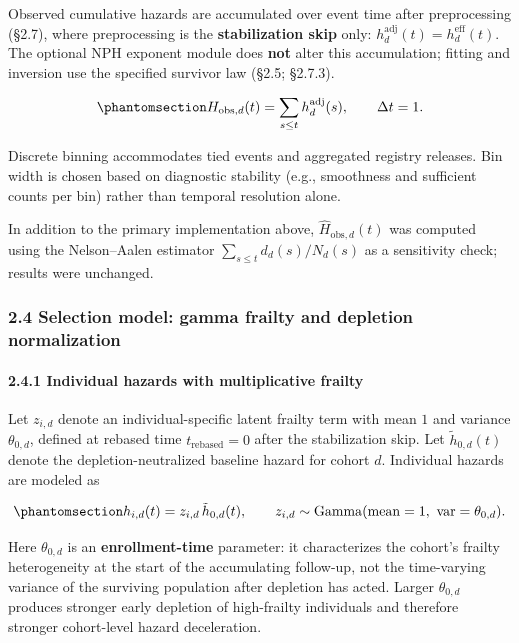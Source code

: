 \documentclass[
]{article}
\begin{document}
Observed cumulative hazards are accumulated over event time after preprocessing (§2.7), where preprocessing is the \textbf{stabilization skip} only: \(h_d^{\mathrm{adj}}(t)=h_d^{\mathrm{eff}}(t)\). The optional NPH exponent module does \textbf{not} alter this accumulation; fitting and inversion use the specified survivor law (§2.5; §2.7.3).

\begin{equation}\protect\phantomsection\label{eq:cumhazard-observed}{H_{\mathrm{obs},d}(t) = \sum_{s \le t} h_d^{\mathrm{adj}}(s),
\qquad \Delta t = 1.}\end{equation}

Discrete binning accommodates tied events and aggregated registry releases. Bin width is chosen based on diagnostic stability (e.g., smoothness and sufficient counts per bin) rather than temporal resolution alone.

In addition to the primary implementation above, \(\hat H_{\mathrm{obs},d}(t)\) was computed using the Nelson--Aalen estimator \(\sum_{s \le t} d_d(s)/N_d(s)\) as a sensitivity check; results were unchanged.

\subsubsection{2.4 Selection model: gamma frailty and depletion normalization}\label{selection-model-gamma-frailty-and-depletion-normalization}

\paragraph{2.4.1 Individual hazards with multiplicative frailty}\label{individual-hazards-with-multiplicative-frailty}

Let \(z_{i,d}\) denote an individual-specific latent frailty term with mean \(1\) and variance \(\theta_{0,d}\), defined at rebased time \(t_{\mathrm{rebased}}=0\) after the stabilization skip. Let \(\tilde h_{0,d}(t)\) denote the depletion-neutralized baseline hazard for cohort \(d\). Individual hazards are modeled as

\begin{equation}\protect\phantomsection\label{eq:individual-hazard-frailty}{h_{i,d}(t) = z_{i,d}\,\tilde h_{0,d}(t),
\qquad
z_{i,d} \sim \mathrm{Gamma}(\mathrm{mean}=1,\ \mathrm{var}=\theta_{0,d}).}\end{equation}

Here \(\theta_{0,d}\) is an \textbf{enrollment-time} parameter: it characterizes the cohort's frailty heterogeneity at the start of the accumulating follow-up, not the time-varying variance of the surviving population after depletion has acted. Larger \(\theta_{0,d}\) produces stronger early depletion of high-frailty individuals and therefore stronger cohort-level hazard deceleration.
\end{document}
